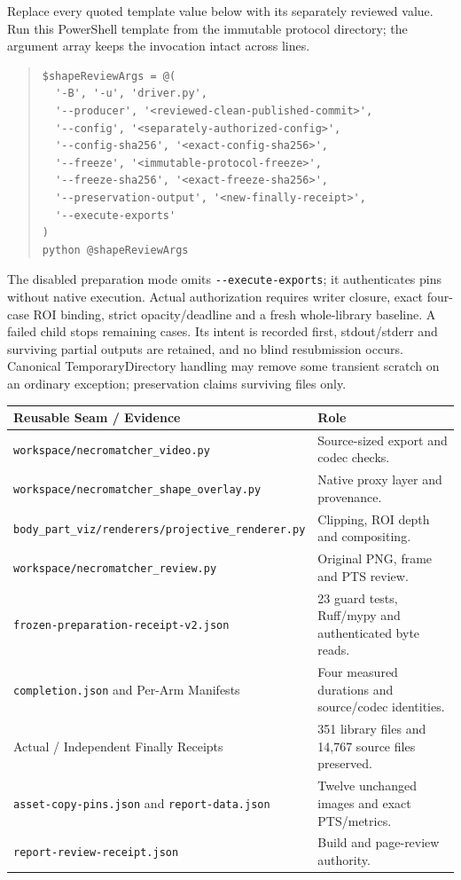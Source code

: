 \documentclass[11pt,letterpaper]{article}
\newcommand{\code}[1]{\nolinkurl{#1}}\newcommand{\hash}[1]{{\footnotesize\nolinkurl{#1}}}
\begin{document}
Replace every quoted template value below with its separately reviewed value.
Run this PowerShell template from the immutable protocol directory; the argument
array keeps the invocation intact across lines.
\begin{quote}\small
\begin{verbatim}
$shapeReviewArgs = @(
  '-B', '-u', 'driver.py',
  '--producer', '<reviewed-clean-published-commit>',
  '--config', '<separately-authorized-config>',
  '--config-sha256', '<exact-config-sha256>',
  '--freeze', '<immutable-protocol-freeze>',
  '--freeze-sha256', '<exact-freeze-sha256>',
  '--preservation-output', '<new-finally-receipt>',
  '--execute-exports'
)
python @shapeReviewArgs
\end{verbatim}
\end{quote}
The disabled preparation mode omits \code{--execute-exports}; it authenticates pins without
native execution. Actual authorization requires writer closure, exact four-case ROI binding,
strict opacity/deadline and a fresh whole-library baseline. A failed child stops remaining
cases. Its intent is recorded first, stdout/stderr and surviving partial outputs are retained,
and no blind resubmission occurs. Canonical TemporaryDirectory handling may remove
some transient scratch on an ordinary exception; preservation claims surviving files only.

{\small\begin{longtable}{@{}>{\raggedright\arraybackslash}p{2.45in}p{3.35in}@{}}\toprule
Reusable Seam / Evidence & Role\\\midrule\endhead
\code{workspace/necromatcher_video.py} & Source-sized export and codec checks.\\
\code{workspace/necromatcher_shape_overlay.py} & Native proxy layer and provenance.\\
\code{body_part_viz/renderers/projective_renderer.py} & Clipping, ROI depth and compositing.\\
\code{workspace/necromatcher_review.py} & Original PNG, frame and PTS review.\\
\code{frozen-preparation-receipt-v2.json} & 23 guard tests, Ruff/mypy and authenticated byte reads.\\
\code{completion.json} and Per-Arm Manifests & Four measured durations and source/codec identities.\\
Actual / Independent Finally Receipts & 351 library files and 14,767 source files preserved.\\
\code{asset-copy-pins.json} and \code{report-data.json} & Twelve unchanged images and exact PTS/metrics.\\
\code{report-review-receipt.json} & Build and page-review authority.\\\bottomrule
\end{longtable}}
\end{document}
